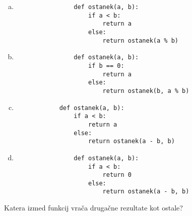\documentclass[arhiv, 10pt]{../izpit}
\begin{document}
        \begin{multicols}{2}
        \begin{enumerate}[(a)]
\item 
                \begin{verbatim}
                def ostanek(a, b):
                    if a < b:
                        return a
                    else:
                        return ostanek(a % b)
                \end{verbatim}
            
\item 
                \begin{verbatim}
                def ostanek(a, b):
                    if b == 0:
                        return a
                    else:
                        return ostanek(b, a % b)
                \end{verbatim}
            
\item 
            \begin{verbatim}
            def ostanek(a, b):
                if a < b:
                    return a
                else:
                    return ostanek(a - b, b)
            \end{verbatim}
        
\item 
                \begin{verbatim}
                def ostanek(a, b):
                    if a < b:
                        return 0
                    else:
                        return ostanek(a - b, b)
                \end{verbatim}
            
\end{enumerate}

        \end{multicols}
    
        \naloga*
        
        Katera izmed funkcij vrača drugačne rezultate kot ostale?
    
\end{document}
